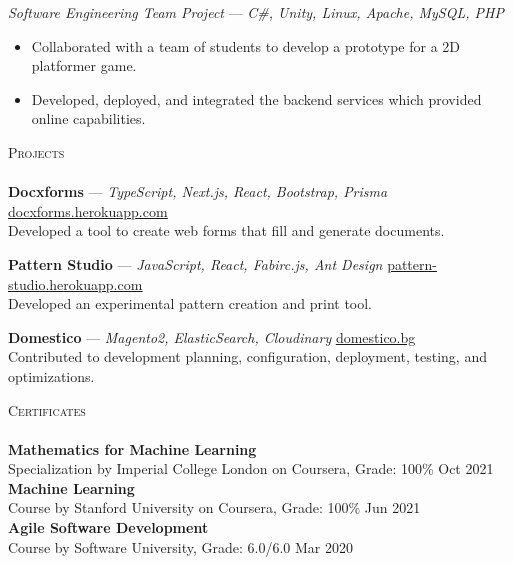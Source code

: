 \documentclass[a4paper]{article}
\newcommand{\lineunder} {
    \vspace*{-8pt} \\
    \hspace*{-18pt} \hrulefill \\
}
\newcommand{\header} [1] {
    {\hspace*{-18pt}\vspace*{6pt} \textsc{#1}}
    \vspace*{-6pt} \lineunder
}
\begin{document}
{\textit{Software Engineering Team Project}} — {\sl C\#, Unity, Linux, Apache, MySQL, PHP}\
\vspace{-1mm}
\begin{itemize} \itemsep 1pt
	\item Collaborated with a team of students to develop a prototype for a 2D platformer game.
	\item Developed, deployed, and integrated the backend services which provided online capabilities.
\end{itemize}

\header{Projects}
{\textbf{Docxforms}} — {\sl TypeScript, Next.js, React, Bootstrap, Prisma} \hfill \href{https://docxforms.herokuapp.com/}{\underline{docxforms.herokuapp.com}}\\
Developed a tool to create web forms that fill and generate documents.
\vspace*{1mm}

{\textbf{Pattern Studio}} — {\sl JavaScript, React, Fabirc.js, Ant Design} \hfill \href{https://pattern-studio.herokuapp.com/}{\underline{pattern-studio.herokuapp.com}}\\
Developed an experimental pattern creation and print tool.
\vspace*{1mm}

{\textbf{Domestico}} — {\sl Magento2, ElasticSearch, Cloudinary} \hfill \href{https://domestico.bg/}{\underline{domestico.bg}}\\
Contributed to development planning, configuration, deployment, testing, and optimizations.
\vspace*{1mm}

\header{Certificates}
\textbf{Mathematics for Machine Learning}\\
Specialization by Imperial College London on Coursera, Grade: 100\% \hfill Oct 2021\\
\vspace*{1mm}
\textbf{Machine Learning}\\
Course by Stanford University on Coursera, Grade: 100\% \hfill Jun 2021\\
\vspace*{1mm}
\textbf{Agile Software Development}\\
Course by Software University, Grade: 6.0/6.0 \hfill Mar 2020\\
\vspace*{1mm}


\ 
\end{document}
